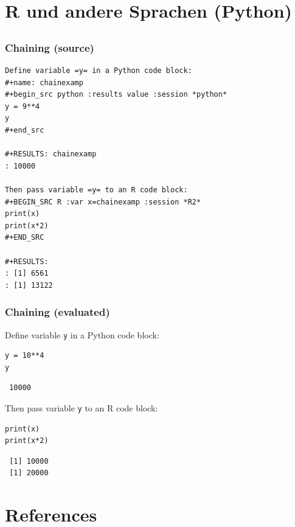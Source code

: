 \documentclass[bigger]{beamer}
\begin{document}
\section{R und andere Sprachen (Python)}
\label{sec-4}
\subsection{}
\begin{frame}[fragile,shrink = 10]
\frametitle{Chaining (source)}
\label{sec-4-1-1}




\lstset{language=org}
\begin{lstlisting}
Define variable =y= in a Python code block: 
#+name: chainexamp
#+begin_src python :results value :session *python*
y = 9**4
y
#+end_src

#+RESULTS: chainexamp
: 10000

Then pass variable =y= to an R code block:
#+BEGIN_SRC R :var x=chainexamp :session *R2*
print(x)
print(x*2)
#+END_SRC

#+RESULTS:
: [1] 6561
: [1] 13122
\end{lstlisting}
\end{frame}
\begin{frame}[fragile]
\frametitle{Chaining (evaluated)}
\label{sec-4-1-2}


Define variable \texttt{y} in a Python code block: 

\lstset{language=Python}
\begin{lstlisting}
y = 10**4
y
\end{lstlisting}

\begin{verbatim}
 10000
\end{verbatim}


Then pass variable \texttt{y} to an R code block:

\lstset{language=R}
\begin{lstlisting}
print(x)
print(x*2)
\end{lstlisting}

\begin{verbatim}
 [1] 10000
 [1] 20000
\end{verbatim}
\end{frame}
\section{References}
\label{sec-5}
\end{document}
